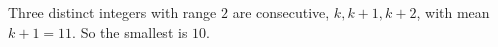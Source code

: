 Three distinct integers with range $2$ are consecutive, $k,k+1,k+2$, with mean $k+1=11$. So the smallest is $\boxed{10}$.
